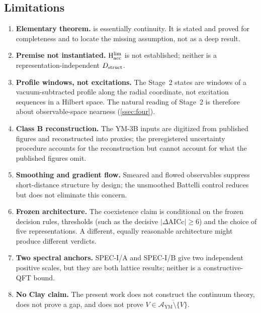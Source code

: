 \documentclass[11pt,a4paper]{article}
\theoremstyle{definition}
\theoremstyle{remark}
\newcommand{\AYM}{\mathcal{A}_{\mathrm{YM}}}
\newcommand{\Hacc}{\mathrm{H}_{\mathrm{acc}}}
\begin{document}
\subsection{Limitations}\label{ssec:limitations}
\begin{enumerate}[label=(L\arabic*)]
\item \textbf{Elementary theorem.}  is essentially continuity. It is stated and proved for completeness and to locate the missing assumption, not as a deep result.
\item \textbf{Premise not instantiated.} $\Hacc^{\rm lim}$ is not established; neither is a representation-independent $D_{\rm struct}$.
\item \textbf{Profile windows, not excitations.} The Stage~2 states are windows of a vacuum-subtracted profile along the radial coordinate, not excitation sequences in a Hilbert space. The natural reading of Stage~2 is therefore about observable-space nearness (\cref{ssec:four}).
\item \textbf{Class B reconstruction.} The YM-3B inputs are digitized from published figures and reconstructed into proxies; the preregistered uncertainty procedure accounts for the reconstruction but cannot account for what the published figures omit.
\item \textbf{Smoothing and gradient flow.} Smeared and flowed observables suppress short-distance structure by design; the unsmoothed Battelli control reduces but does not eliminate this concern.
\item \textbf{Frozen architecture.} The coexistence claim is conditional on the frozen decision rules, thresholds (such as the decisive $|\Delta\mathrm{AICc}|\ge6$) and the choice of five representations. A different, equally reasonable architecture might produce different verdicts.
\item \textbf{Two spectral anchors.} SPEC-I/A and SPEC-I/B give two independent positive scales, but they are both lattice results; neither is a constructive-QFT bound.
\item \textbf{No Clay claim.} The present work does not construct the continuum theory, does not prove a gap, and does not prove $V\in\overline{\AYM\setminus\{V\}}$.
\end{enumerate}
\end{document}
